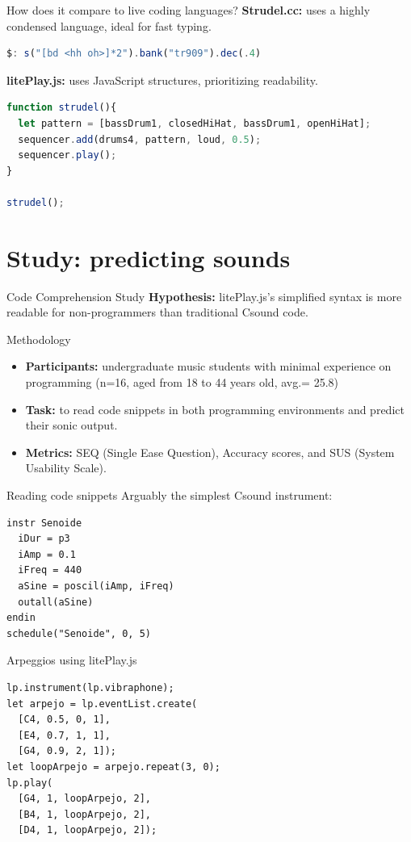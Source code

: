 \documentclass[10pt]{beamer}
\begin{document}
\begin{frame}[fragile]{How does it compare to live coding languages?}
    \textbf{Strudel.cc:} uses a highly condensed language, ideal for fast typing.
\begin{lstlisting}[language=JavaScript, backgroundcolor=\color{lightgray}]
$: s("[bd <hh oh>]*2").bank("tr909").dec(.4)
\end{lstlisting}

   \vspace{0.3cm}
    \textbf{litePlay.js:} uses JavaScript structures, prioritizing readability.
\begin{lstlisting}[language=JavaScript, backgroundcolor=\color{lightgray}]
function strudel(){
  let pattern = [bassDrum1, closedHiHat, bassDrum1, openHiHat];
  sequencer.add(drums4, pattern, loud, 0.5);
  sequencer.play();
}

strudel();
\end{lstlisting}
\end{frame}

\section{Study: predicting sounds}
\begin{frame}{Code Comprehension Study}
    \textbf{Hypothesis:} litePlay.js's simplified syntax is more readable for non-programmers than traditional Csound code.
    \begin{block}{Methodology}
        \begin{itemize}
		\item \textbf{Participants:} undergraduate music students with
			minimal experience on programming (n=16, aged from 18
			to 44 years old, avg.= 25.8)
		\item \textbf{Task:} to read code snippets in both programming environments and predict their sonic output.
	    \item \textbf{Metrics:} SEQ (Single Ease Question), Accuracy scores, and SUS (System Usability Scale).
        \end{itemize}
    \end{block}
\end{frame}

\begin{frame}[fragile]{Reading code snippets}
Arguably the simplest Csound instrument:
\begin{lstlisting}
instr Senoide
  iDur = p3
  iAmp = 0.1
  iFreq = 440
  aSine = poscil(iAmp, iFreq)
  outall(aSine)
endin
schedule("Senoide", 0, 5)
\end{lstlisting}
Arpeggios using litePlay.js
\begin{lstlisting}
lp.instrument(lp.vibraphone);
let arpejo = lp.eventList.create(
  [C4, 0.5, 0, 1],
  [E4, 0.7, 1, 1],
  [G4, 0.9, 2, 1]);
let loopArpejo = arpejo.repeat(3, 0);
lp.play(
  [G4, 1, loopArpejo, 2],
  [B4, 1, loopArpejo, 2],
  [D4, 1, loopArpejo, 2]);
    \end{lstlisting}
\end{frame}
\end{document}
